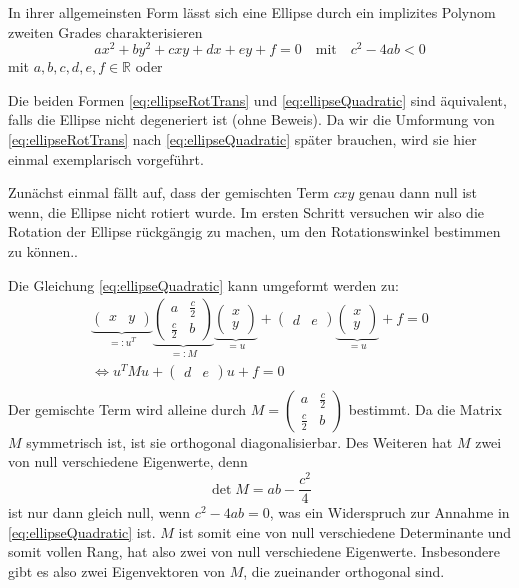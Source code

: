 In ihrer allgemeinsten Form lässt sich eine Ellipse durch ein implizites Polynom zweiten Grades charakterisieren
\begin{equation} \label{eq:ellipseQuadratic}
ax^2 + by^2 + cxy + dx + ey + f = 0 \quad \text{mit}\quad c^2-4ab < 0
\end{equation} 
mit $a,b,c,d,e,f \in \mathbb{R}$ oder


Die beiden Formen \ref{eq:ellipseRotTrans} und \ref{eq:ellipseQuadratic} sind äquivalent, falls die Ellipse nicht degeneriert ist (ohne Beweis). Da wir die Umformung von \ref{eq:ellipseRotTrans} nach \ref{eq:ellipseQuadratic} später brauchen, wird sie hier einmal exemplarisch vorgeführt. 

Zunächst einmal fällt auf, dass der gemischten Term $cxy$ genau dann null ist wenn, die Ellipse nicht rotiert wurde. Im ersten Schritt versuchen wir also die Rotation der Ellipse rückgängig zu machen, um den Rotationswinkel bestimmen zu können..

Die Gleichung \ref{eq:ellipseQuadratic} kann umgeformt werden zu:
\begin{equation*}
\begin{aligned}
\underbrace{\begin{pmatrix}x & y\end{pmatrix}}_{=:u^T}\underbrace{\begin{pmatrix}a & \frac{c}{2} \\ \frac{c}{2} & b\end{pmatrix}}_{=: M}\underbrace{\begin{pmatrix}x \\ y\end{pmatrix}}_{=u} +\begin{pmatrix}d & e\end{pmatrix}\underbrace{\begin{pmatrix}x \\ y\end{pmatrix}}_{=u}+ f = 0 \\
\Leftrightarrow u^TMu +\begin{pmatrix}d & e\end{pmatrix}u + f = 0 \\
\end{aligned}
\end{equation*} 
Der gemischte Term wird alleine durch $M = \begin{pmatrix}a & \frac{c}{2} \\ \frac{c}{2} & b\end{pmatrix}$ bestimmt. Da die Matrix $M$ symmetrisch ist, ist sie orthogonal diagonalisierbar. Des Weiteren hat $M$ zwei von null verschiedene Eigenwerte, denn 
\[
\det M = ab - \dfrac{c^2}{4}
\] ist nur dann gleich null, wenn $c^2 - 4ab = 0$, was ein Widerspruch zur Annahme in \ref{eq:ellipseQuadratic} ist. $M$ ist somit eine von null verschiedene Determinante und somit vollen Rang, hat also zwei von null verschiedene Eigenwerte. Insbesondere gibt es also zwei Eigenvektoren von $M$, die zueinander orthogonal sind.

